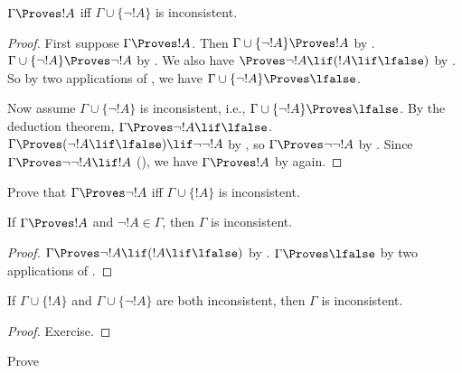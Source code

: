\begin{prop}
$\Gamma \Proves !A$ iff $\Gamma \cup \{\lnot !A\}$ is inconsistent.
\end{prop}

\begin{proof}
First suppose $\Gamma \Proves !A$. Then $\Gamma \cup \{\lnot !A\}
\Proves !A$ by . $\Gamma \cup \{\lnot
!A\} \Proves \lnot !A$ by .  We also have
$\Proves \lnot !A \lif (!A \lif \lfalse)$ by . So
by two applications of , we have $\Gamma \cup \{\lnot
!A\} \Proves \lfalse$.

Now assume $\Gamma \cup \{\lnot !A\}$ is inconsistent, i.e., $\Gamma
\cup \{\lnot !A\} \Proves \lfalse$. By the deduction theorem, $\Gamma
\Proves \lnot !A \lif \lfalse$. $\Gamma \Proves (\lnot !A \lif
\lfalse) \lif \lnot\lnot !A$ by , so $\Gamma
\Proves \lnot\lnot !A$ by . Since $\Gamma \Proves
\lnot\lnot !A \lif !A$ (), we have $\Gamma
\Proves !A$ by  again.
\end{proof}

\begin{prob}
Prove that $\Gamma \Proves \lnot !A$ iff $\Gamma \cup \{!A\}$ is
inconsistent.
\end{prob}

\begin{prop}
  If $\Gamma \Proves !A$ and $\lnot !A \in \Gamma$, then $\Gamma$ is
  inconsistent.
\end{prop}

\begin{proof}
  $\Gamma \Proves \lnot !A \lif (!A \lif \lfalse)$ by .
  $\Gamma \Proves \lfalse$ by two applications of .
\end{proof}


\begin{prop}
  If $\Gamma \cup \{!A\}$ and $\Gamma \cup \{\lnot !A\}$ are both
  inconsistent, then $\Gamma$ is inconsistent.
\end{prop}

\begin{proof}
Exercise.
\end{proof}




\begin{prob}
  Prove 
\end{prob}







